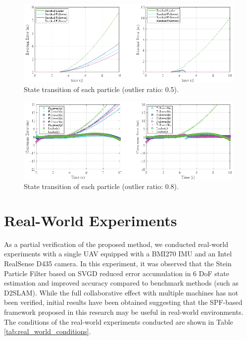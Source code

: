 \documentclass[a4paper,fleqn,10pt,twocolumn]{SICE_ISCS}
\begin{document}
\begin{figure}[t]
	\begin{center}
		\includegraphics[width=\linewidth]{Fig/Leader_Residual_2ko1.eps}
		\caption{State transition of each particle (outlier ratio: 0.5).}
		\label{fig:particle_transition_05}
	\end{center}
	\vspace{-2mm}
\end{figure}

\begin{figure}[t]
	\begin{center}
		\includegraphics[width=\linewidth]{Fig/Leader_Consensus_2ko1.eps}
		\caption{State transition of each particle (outlier ratio: 0.8).}
		\label{fig:particle_transition_08}
	\end{center}
	\vspace{-2mm}
\end{figure}

\section{Real-World Experiments}
As a partial verification of the proposed method, we conducted real-world experiments with a single UAV equipped with a BMI270 IMU and an Intel RealSense D435 camera. In this experiment, it was observed that the Stein Particle Filter based on SVGD reduced error accumulation in 6 DoF state estimation and improved accuracy compared to benchmark methods (such as D2SLAM). While the full collaborative effect with multiple machines has not been verified, initial results have been obtained suggesting that the SPF-based framework proposed in this research may be useful in real-world environments. The conditions of the real-world experiments conducted are shown in Table \ref{tab:real_world_conditions}.
\end{document}

